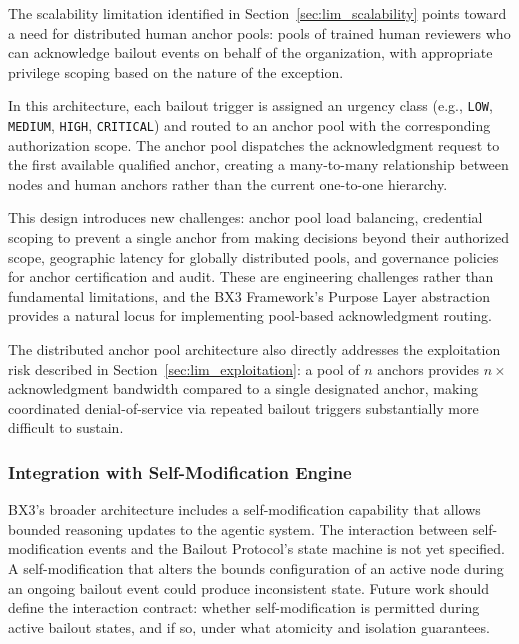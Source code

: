 The scalability limitation identified in Section~\ref{sec:lim_scalability} points toward a need for distributed human anchor pools: pools of trained human reviewers who can acknowledge bailout events on behalf of the organization, with appropriate privilege scoping based on the nature of the exception.

In this architecture, each bailout trigger is assigned an urgency class (e.g., \texttt{LOW}, \texttt{MEDIUM}, \texttt{HIGH}, \texttt{CRITICAL}) and routed to an anchor pool with the corresponding authorization scope. The anchor pool dispatches the acknowledgment request to the first available qualified anchor, creating a many-to-many relationship between nodes and human anchors rather than the current one-to-one hierarchy.

This design introduces new challenges: anchor pool load balancing, credential scoping to prevent a single anchor from making decisions beyond their authorized scope, geographic latency for globally distributed pools, and governance policies for anchor certification and audit. These are engineering challenges rather than fundamental limitations, and the BX3 Framework's Purpose Layer abstraction provides a natural locus for implementing pool-based acknowledgment routing.

The distributed anchor pool architecture also directly addresses the exploitation risk described in Section~\ref{sec:lim_exploitation}: a pool of $n$ anchors provides $n\times$ acknowledgment bandwidth compared to a single designated anchor, making coordinated denial-of-service via repeated bailout triggers substantially more difficult to sustain.

\subsubsection{Integration with Self-Modification Engine}
\label{sec:fw_self_mod}

BX3's broader architecture includes a self-modification capability that allows bounded reasoning updates to the agentic system. The interaction between self-modification events and the Bailout Protocol's state machine is not yet specified. A self-modification that alters the bounds configuration of an active node during an ongoing bailout event could produce inconsistent state. Future work should define the interaction contract: whether self-modification is permitted during active bailout states, and if so, under what atomicity and isolation guarantees.

